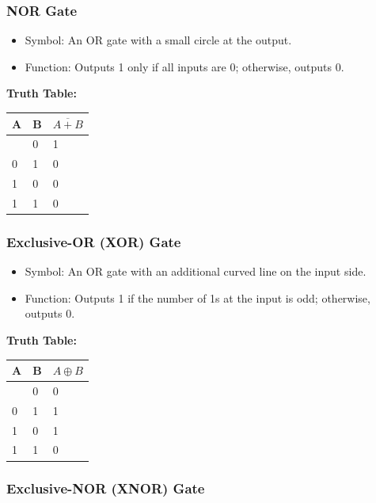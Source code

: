 \documentclass[11pt,a4paper]{article}
\providecommand{\tightlist}{\setlength{\itemsep}{1pt}\setlength{\parskip}{0pt}}
\begin{document}
\subsubsection{NOR Gate}\label{nor-gate}

\begin{itemize}
\tightlist
\item
  Symbol: An OR gate with a small circle at the output.
\item
  Function: Outputs 1 only if all inputs are 0; otherwise, outputs 0.
\end{itemize}

\textbf{Truth Table:}

\begin{longtable}[]{@{}lll@{}}
\toprule\noalign{}
A & B & \(\overline{A + B}\) \\
\midrule\noalign{}
\endhead
\bottomrule\noalign{}
\endlastfoot
0 & 0 & 1 \\
0 & 1 & 0 \\
1 & 0 & 0 \\
1 & 1 & 0 \\
\end{longtable}

\subsubsection{Exclusive-OR (XOR) Gate}\label{exclusive-or-xor-gate}

\begin{itemize}
\tightlist
\item
  Symbol: An OR gate with an additional curved line on the input side.
\item
  Function: Outputs 1 if the number of 1s at the input is odd;
  otherwise, outputs 0.
\end{itemize}

\textbf{Truth Table:}

\begin{longtable}[]{@{}lll@{}}
\toprule\noalign{}
A & B & \(A \oplus B\) \\
\midrule\noalign{}
\endhead
\bottomrule\noalign{}
\endlastfoot
0 & 0 & 0 \\
0 & 1 & 1 \\
1 & 0 & 1 \\
1 & 1 & 0 \\
\end{longtable}

\subsubsection{Exclusive-NOR (XNOR) Gate}\label{exclusive-nor-xnor-gate}
\end{document}

